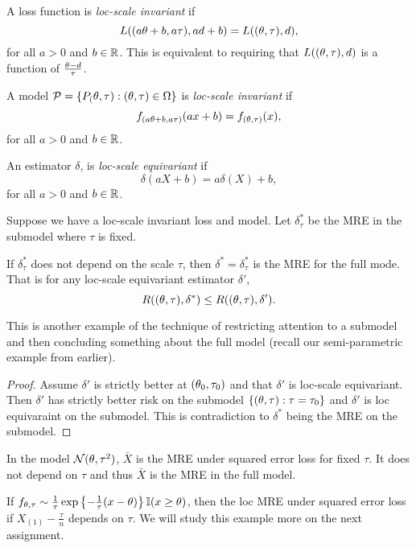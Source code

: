 \begin{defn}
    A loss function is \emph{loc-scale invariant} if 
    \[L((a{\theta}+b,a\tau), ad+b) = L(({\theta},\tau),d), \]
    for all $a >0$ and $b \in {\mathbb R}$. This is equivalent to requiring that $L(({\theta},\tau),d)$ is a function of $\frac{{\theta}-d}{\tau}$.
\end{defn}

\begin{defn}
    A model ${\mathcal{P}} = \{P_({\theta},\tau) : ({\theta},\tau) \in {{\Omega}} \}$ is \emph{loc-scale invariant} if 
    \[f_{(a{\theta}+b,a\tau)}(ax+b) = f_{({\theta},\tau)}(x), \]
    for all $a >0$ and $b \in {\mathbb R}$.
\end{defn}
\begin{defn}
    An estimator $\delta$, is \emph{loc-scale equivariant} if 
    \[\delta(aX+b) = a\delta(X)+b, \]
    for all $a > 0$ and $b \in {\mathbb R}$.
\end{defn}

\begin{thrm}
    Suppose we have a loc-scale invariant loss and model. Let $\delta_\tau^*$ be the MRE in the submodel where $\tau$ is fixed.

    If $\delta_\tau^*$ does not depend on the scale $\tau$, then $\delta^* = \delta_\tau^*$ is the MRE for the full mode. That is for any loc-scale equivariant estimator $\delta'$,
    \[R(({\theta},\tau), \delta^*) \le R(({\theta},\tau), \delta'). \]
\end{thrm}
This is another example of the technique of restricting attention to a submodel and then concluding something about the full model (recall our semi-parametric example from earlier).
\begin{proof}
    Assume $\delta'$ is strictly better at $({\theta}_0,\tau_0)$ and that $\delta'$ is loc-scale equivariant. Then $\delta'$ has strictly better risk on the submodel $\{({\theta},\tau): \tau= \tau_0\}$ and $\delta'$ is loc equivaraint on the submodel. This is contradiction to $\delta^*$ being the MRE on the submodel.
\end{proof}

\begin{ex}
    In the model ${{\mathcal{N}}}({\theta},\tau^2)$, $\bar{X}$ is the MRE under squared error loss for fixed $\tau$. It does not depend on $\tau$ and thus $\bar{X}$ is the MRE in the full model.
\end{ex}

\begin{ex}
    If $f_{{\theta},\tau} \sim \frac{1}{\tau} \exp\left\{-\frac{1}{\tau}(x-{\theta})\right\}\mathbb{I}(x\ge {\theta})$, then the loc MRE under squared error loss if $X_{(1)}-\frac{\tau}{n}$ depends on $\tau$. We will study this example more on the next assignment.
\end{ex}

